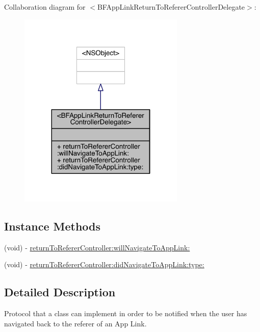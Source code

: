 Collaboration diagram for $<$B\-F\-App\-Link\-Return\-To\-Referer\-Controller\-Delegate$>$\-:
\nopagebreak
\begin{figure}[H]
\begin{center}
\leavevmode
\includegraphics[width=224pt]{protocol_b_f_app_link_return_to_referer_controller_delegate-p__coll__graph}
\end{center}
\end{figure}
\subsection*{Instance Methods}
\begin{DoxyCompactItemize}
\item 
(void) -\/ \hyperlink{protocol_b_f_app_link_return_to_referer_controller_delegate-p_aaea360a5dbe5f3676c5821fbdcad9913}{return\-To\-Referer\-Controller\-:will\-Navigate\-To\-App\-Link\-:}
\item 
(void) -\/ \hyperlink{protocol_b_f_app_link_return_to_referer_controller_delegate-p_a204e256c1d32c7906a11662bed988c2a}{return\-To\-Referer\-Controller\-:did\-Navigate\-To\-App\-Link\-:type\-:}
\end{DoxyCompactItemize}


\subsection{Detailed Description}
Protocol that a class can implement in order to be notified when the user has navigated back to the referer of an App Link. 

